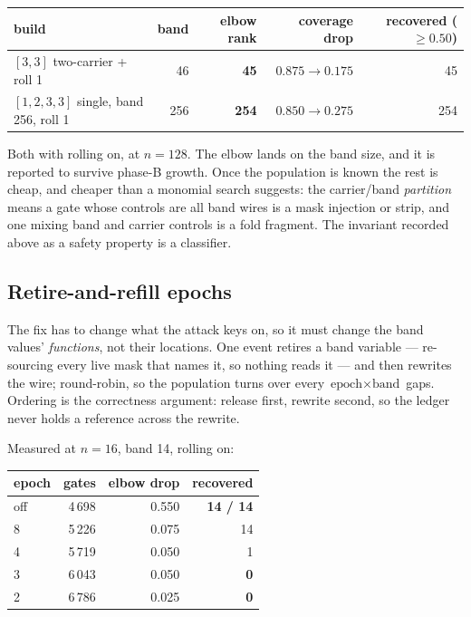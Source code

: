 \documentclass[11pt]{article}
\begin{document}
\begin{center}
\begin{tabular}{lrrrr}
\toprule
build & band & elbow rank & coverage drop & recovered ($\ge 0.50$) \\
\midrule
$[3,3]$ two-carrier + roll 1 & 46 & \textbf{45} & $0.875 \to 0.175$ & 45 \\
$[1,2,3,3]$ single, band 256, roll 1 & 256 & \textbf{254} & $0.850 \to 0.275$ & 254 \\
\bottomrule
\end{tabular}
\end{center}

Both with rolling on, at $n{=}128$. The elbow lands on the band size, and it is
reported to survive phase-B growth. Once the population is known the rest is
cheap, and cheaper than a monomial search suggests: the carrier/band
\emph{partition} means a gate whose controls are all band wires is a mask
injection or strip, and one mixing band and carrier controls is a fold
fragment. The invariant recorded above as a safety property is a classifier.

\subsection{Retire-and-refill epochs}

The fix has to change what the attack keys on, so it must change the band
values' \emph{functions}, not their locations. One event retires a band
variable --- re-sourcing every live mask that names it, so nothing reads it ---
and then rewrites the wire; round-robin, so the population turns over every
$\text{epoch}\times\text{band}$ gaps. Ordering is the correctness argument:
release first, rewrite second, so the ledger never holds a reference across
the rewrite.

Measured at $n{=}16$, band 14, rolling on:

\begin{center}
\begin{tabular}{lrrr}
\toprule
epoch & gates & elbow drop & recovered \\
\midrule
off & 4\,698 & 0.550 & \textbf{14 / 14} \\
8 & 5\,226 & 0.075 & 14 \\
4 & 5\,719 & 0.050 & 1 \\
3 & 6\,043 & 0.050 & \textbf{0} \\
2 & 6\,786 & 0.025 & \textbf{0} \\
\bottomrule
\end{tabular}
\end{center}
\end{document}

